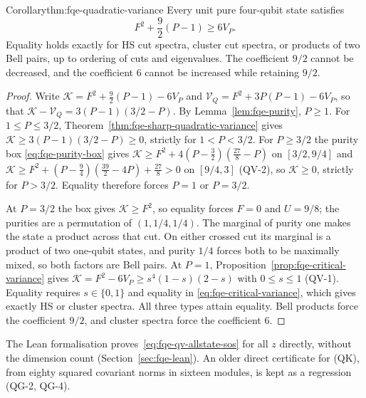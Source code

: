 \begin{restated}{Corollary}{thm:fqe-quadratic-variance}
Every unit pure four-qubit state satisfies
\[
\boxed{\qquad F^2+\frac92(P-1)\ge6V_P.\qquad}
\tag{QK}
\]
Equality holds exactly for HS cut spectra, cluster cut spectra, or products
of two Bell pairs, up to ordering of cuts and eigenvalues.
The coefficient $9/2$ cannot be decreased, and the coefficient $6$ cannot
be increased while retaining $9/2$.
\end{restated}
\begin{proof}
Write $\mathcal K=F^2+\frac92(P-1)-6V_P$ and $\mathcal V_Q=F^2+3P(P-1)-6V_P$, so that
$\mathcal K-\mathcal V_Q=3(P-1)(3/2-P)$. By Lemma~\ref{lem:fqe-purity}, $P\ge1$. For $1\le P\le3/2$,
Theorem~\ref{thm:fqe-sharp-quadratic-variance} gives $\mathcal K\ge3(P-1)(3/2-P)\ge0$, strictly for $1<P<3/2$.
For $P\ge3/2$ the purity box \eqref{eq:fqe-purity-box} gives
$\mathcal K\ge F^2+4(P-\tfrac32)(\tfrac{27}8-P)$ on $[3/2,9/4]$ and
$\mathcal K\ge F^2+(P-\tfrac94)(\tfrac{39}2-4P)+\tfrac{27}8>0$ on $[9/4,3]$ (QV-2), so $\mathcal K\ge0$, strictly for
$P>3/2$. Equality therefore forces $P=1$ or $P=3/2$.

At $P=3/2$ the box gives $\mathcal K\ge F^2$, so equality forces $F=0$ and $U=9/8$; the purities are a permutation of
$(1,1/4,1/4)$. The marginal of purity one makes the state a product across that cut. On either crossed cut its
marginal is a product of two one-qubit states, and purity $1/4$ forces both to be maximally mixed, so both factors
are Bell pairs. At $P=1$, Proposition~\ref{prop:fqe-critical-variance} gives
$\mathcal K=F^2-6V_P\ge s^4(1-s)(2-s)$ with $0\le s\le1$ (QV-1). Equality requires $s\in\{0,1\}$ and equality in
\eqref{eq:fqe-critical-variance}, which gives exactly HS or cluster spectra. All three types attain equality.
Bell products force the coefficient $9/2$, and cluster spectra force the coefficient $6$.
\end{proof}

The Lean formalisation proves~\eqref{eq:fqe-qv-allstate-sos} for all $z$ directly, without the dimension count
(Section~\ref{sec:fqe-lean}). An older direct certificate for (QK), from eighty squared covariant norms in sixteen modules, is
kept as a regression (QG-2, QG-4).

